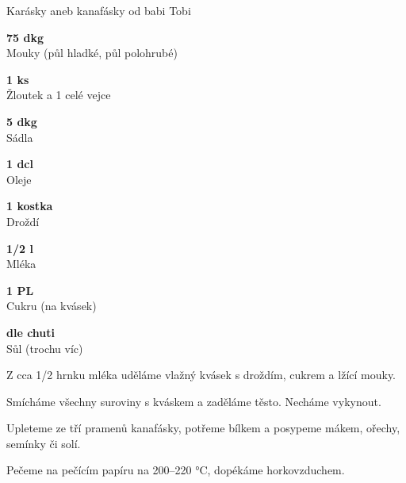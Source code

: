 \documentclass[11pt,a4paper]{article}
\begin{document}
\begin{recipe}[Orange]{Karásky aneb kanafásky od babi Tobi}
    \begin{ingredients}
        \item \parbox[t]{\linewidth}{\raggedright \weight \textbf{75 dkg}\\ Mouky (půl hladké, půl polohrubé)}
        \item \parbox[t]{\linewidth}{\raggedright \piece \textbf{1 ks}\\ Žloutek a 1 celé vejce}
        \item \parbox[t]{\linewidth}{\raggedright \weight \textbf{5 dkg}\\ Sádla}
        \item \parbox[t]{\linewidth}{\raggedright \liquid \textbf{1 dcl}\\ Oleje}
        \item \parbox[t]{\linewidth}{\raggedright \piece \textbf{1 kostka}\\ Droždí}
        \item \parbox[t]{\linewidth}{\raggedright \liquid \textbf{1/2 l}\\ Mléka}
        \item \parbox[t]{\linewidth}{\raggedright \spoon \textbf{1 PL}\\ Cukru (na kvásek)}
        \item \parbox[t]{\linewidth}{\raggedright \indefinite \textbf{dle chuti}\\ Sůl (trochu víc)}
    \end{ingredients}
    \begin{steps}
        \item Z cca 1/2 hrnku mléka uděláme vlažný kvásek s droždím, cukrem a lžící mouky.
        \item Smícháme všechny suroviny s kváskem a zaděláme těsto. Necháme vykynout.
        \item Upleteme ze tří pramenů kanafásky, potřeme bílkem a posypeme mákem, ořechy, semínky či solí.
        \item Pečeme na pečícím papíru na 200--220 °C, dopékáme horkovzduchem.
    \end{steps}
\end{recipe}
\end{document}
